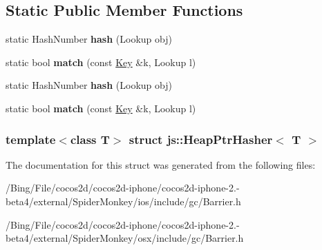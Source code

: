 \subsection*{Static Public Member Functions}
\begin{DoxyCompactItemize}
\item 
\hypertarget{structjs_1_1_heap_ptr_hasher_a71afb615a3ee9ba5bc90f6d0b34f3587}{static Hash\-Number {\bfseries hash} (Lookup obj)}\label{structjs_1_1_heap_ptr_hasher_a71afb615a3ee9ba5bc90f6d0b34f3587}

\item 
\hypertarget{structjs_1_1_heap_ptr_hasher_ad22e4017b0670973a9bfffd080bf496e}{static bool {\bfseries match} (const \hyperlink{classjs_1_1_heap_ptr}{Key} \&k, Lookup l)}\label{structjs_1_1_heap_ptr_hasher_ad22e4017b0670973a9bfffd080bf496e}

\item 
\hypertarget{structjs_1_1_heap_ptr_hasher_a71afb615a3ee9ba5bc90f6d0b34f3587}{static Hash\-Number {\bfseries hash} (Lookup obj)}\label{structjs_1_1_heap_ptr_hasher_a71afb615a3ee9ba5bc90f6d0b34f3587}

\item 
\hypertarget{structjs_1_1_heap_ptr_hasher_ad22e4017b0670973a9bfffd080bf496e}{static bool {\bfseries match} (const \hyperlink{classjs_1_1_heap_ptr}{Key} \&k, Lookup l)}\label{structjs_1_1_heap_ptr_hasher_ad22e4017b0670973a9bfffd080bf496e}

\end{DoxyCompactItemize}
\subsubsection*{template$<$class T$>$ struct js\-::\-Heap\-Ptr\-Hasher$<$ T $>$}



The documentation for this struct was generated from the following files\-:\begin{DoxyCompactItemize}
\item 
/\-Bing/\-File/cocos2d/cocos2d-\/iphone/cocos2d-\/iphone-\/2.-\/beta4/external/\-Spider\-Monkey/ios/include/gc/Barrier.\-h\item 
/\-Bing/\-File/cocos2d/cocos2d-\/iphone/cocos2d-\/iphone-\/2.-\/beta4/external/\-Spider\-Monkey/osx/include/gc/Barrier.\-h\end{DoxyCompactItemize}
